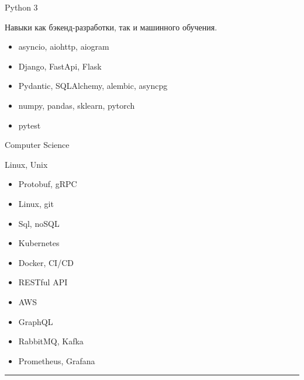 \documentclass[a4paper,10pt]{article}
\newlength{\cvcolumngapwidth}
\newlength{\cvleftcolumnwidth}
\newlength{\cvrightcolumnwidth}
\newcommand{\cvsectionstyle}[1]{{\normalsize\cvsectionfont\textcolor{cvsectioncolor}{#1}}}
\newcommand{\cvheadingstyle}[1]{{\normalsize\cvheadingfont\textcolor{cvheadingcolor}{#1}}}
\newlength{\cvafteritemskipamount}
\newlength{\cvaftersectionskipamount}
\newlength{\cvbetweensectionandheadingextraskipamount}
\newlength{\cvparskip}
\newcommand{\cvsection}[1]{
    \begin{minipage}[t]{\cvleftcolumnwidth}
        \raggedleft\cvsectionstyle{#1}
    \end{minipage}%
    \hspace{\cvcolumngapwidth}%
    \begin{minipage}[t]{\cvrightcolumnwidth}
        \textcolor{cvrulecolor}{\rule{\cvrightcolumnwidth}{0.3mm}}
    \end{minipage}

    \vspace{\cvaftersectionskipamount}
}
\newcommand{\cvitem}[2]{
    \begin{minipage}[t]{\cvleftcolumnwidth}
        \raggedleft #1
    \end{minipage}%
    \hspace{\cvcolumngapwidth}%
    \begin{minipage}[t]{\cvrightcolumnwidth}
        \setlength{\parskip}{\cvparskip} #2
    \end{minipage}

    \vspace{\cvafteritemskipamount}
}
\begin{document}
\cvitem{
    \cvheadingstyle{Python 3}
}{
    Навыки как бэкенд-разработки, так и машинного обучения.
    \begin{itemize}
        \item asyncio, aiohttp, aiogram
        \item Django, FastApi, Flask
        \item Pydantic, SQLAlchemy, alembic, asyncpg
        \item numpy, pandas, sklearn, pytorch
        \item pytest
    \end{itemize}
}

\cvitem{
    \cvheadingstyle{Computer Science}
}{
    Linux, Unix
    \begin{itemize}
        \item Protobuf, gRPC
        \item Linux, git
        \item Sql, noSQL
        \item Kubernetes
        \item Docker, CI/CD
        \item RESTful API
        \item AWS
        \item GraphQL
        \item RabbitMQ, Kafka
        \item Prometheus, Grafana
    \end{itemize}
}



\cvsection{}

\vspace{\cvbetweensectionandheadingextraskipamount}
\end{document}
